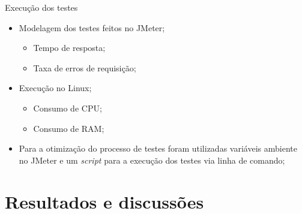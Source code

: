 \documentclass{libs/ufc_format}
\begin{document}

\begin{frame}{Execução dos testes}
    \begin{itemize}
        \item Modelagem dos testes feitos no JMeter\nocite{jmeter}\let\thefootnote\relax{};
            \begin{itemize}
                \item Tempo de resposta;
                \item Taxa de erros de requisição;
            \end{itemize}
        \vspace*{0.5em}
        \item Execução no Linux;
            \begin{itemize}
                \item Consumo de CPU;
                \item Consumo de RAM;
            \end{itemize}
        \vspace*{0.5em}
        \item Para a otimização do processo de testes foram utilizadas variáveis ambiente no JMeter e um \textit{script} para a execução dos testes via linha de comando;
    \end{itemize}
\end{frame}

\section{Resultados e discussões}
\end{document}
